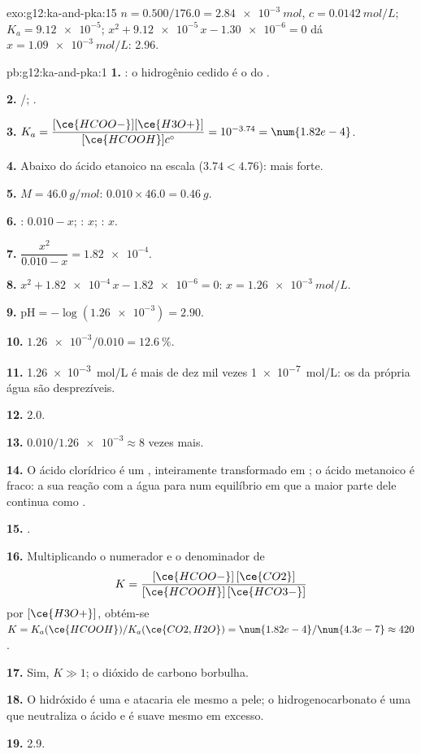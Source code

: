 \begin{solution}{exo:g12:ka-and-pka:15}
$n = 0.500 / 176.0 = \qty{2.84e-3}{mol}$, $c = \qty{0.0142}{mol/L}$;
$K_a = \num{9.12e-5}$; $x^2 + \num{9.12e-5}\,x - \num{1.30e-6} = 0$ dá
$x = \qty{1.09e-3}{mol/L}$:  2.96.
\end{solution}

\begin{solution}{pb:g12:ka-and-pka:1}
\textbf{1.} : o hidrogênio cedido é o do .

\textbf{2.} /; .

\textbf{3.} $K_a = \dfrac{[\ce{HCOO-}][\ce{H3O+}]}{[\ce{HCOOH}]c^\circ} =
10^{-3.74} = \num{1.82e-4}$.

\textbf{4.} Abaixo do ácido etanoico na escala ($3.74 < 4.76$): mais forte.

\textbf{5.} $M = \qty{46.0}{g/mol}$: $0.010 \times 46.0 = \qty{0.46}{g}$.

\textbf{6.} : $0.010 - x$; : $x$; : $x$.

\textbf{7.} $\dfrac{x^2}{0.010 - x} = \num{1.82e-4}$.

\textbf{8.} $x^2 + \num{1.82e-4}\,x - \num{1.82e-6} = 0$:
$x = \qty{1.26e-3}{mol/L}$.

\textbf{9.} $\mathrm{pH} = -\log(\num{1.26e-3}) = 2.90$.

\textbf{10.} $\num{1.26e-3}/0.010 = \qty{12.6}{\percent}$.

\textbf{11.} \qty{1.26e-3}{mol/L} é mais de dez mil vezes
\qty{1e-7}{mol/L}: os  da própria água são desprezíveis.

\textbf{12.}  2.0.

\textbf{13.} $0.010 / \num{1.26e-3} \approx 8$ vezes mais.

\textbf{14.} O ácido clorídrico é um , inteiramente
transformado em ; o ácido metanoico é fraco: a sua reação com a água
para num equilíbrio em que a maior parte dele continua como .

\textbf{15.} .

\textbf{16.} Multiplicando o numerador e o denominador de
\[
  K = \frac{[\ce{HCOO-}]\,[\ce{CO2}]}{[\ce{HCOOH}]\,[\ce{HCO3-}]}
\]
por $[\ce{H3O+}]$, obtém-se $K = K_a(\ce{HCOOH}) / K_a(\ce{CO2,H2O}) =
\num{1.82e-4}/\num{4.3e-7} \approx 420$.

\textbf{17.} Sim, $K \gg 1$; o dióxido de carbono borbulha.

\textbf{18.} O hidróxido é uma  e atacaria ele mesmo a pele; o
hidrogenocarbonato é uma  que neutraliza o ácido e é suave
mesmo em excesso.

\textbf{19.}  2.9.
\end{solution}
